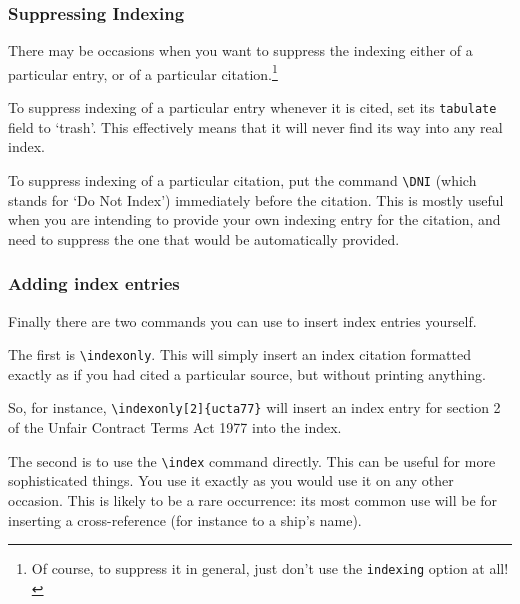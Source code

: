 \documentclass[a5paper,fontsize=9pt,DIV=1]{scrartcl}
\begin{document}
\subsubsection{Suppressing Indexing}

There may be occasions when you want to suppress the indexing either
of a particular entry, or of a particular citation.\footnote{Of course, to suppress it in general, just don't use the \texttt{indexing} option at all!}

To suppress indexing of a particular entry whenever it is cited, set
its \texttt{tabulate} field to `trash'. This effectively means that it
will never find its way into any real index.

To suppress indexing of a particular citation, put the command
\verb|\DNI| (which stands for `Do Not Index') immediately before the
citation. This is mostly useful when you are intending to provide
your own indexing entry for the citation, and need to suppress the one
that would be automatically provided.

\subsubsection{Adding index entries\label{trickyindexing}}

Finally there are two commands you can use to insert index entries yourself.

The first is \verb|\indexonly|. This will simply insert an index
citation formatted exactly as if you had cited a particular source,
but without printing anything.

So, for instance, \verb|\indexonly[2]{ucta77}| will insert an index
entry for section 2 of the Unfair Contract Terms Act 1977 into the
index.

The second is to use the \verb|\index| command directly. This can be
useful for more sophisticated things. You use it exactly as you would
use it on any other occasion. This is likely to be a rare occurrence:
its most common use will be for inserting a cross-reference (for
instance to a ship's name).
\end{document}

